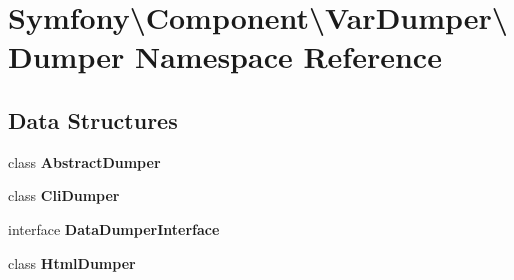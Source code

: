 \section{Symfony\textbackslash{}Component\textbackslash{}Var\+Dumper\textbackslash{}Dumper Namespace Reference}
\label{namespace_symfony_1_1_component_1_1_var_dumper_1_1_dumper}
\subsection*{Data Structures}
\begin{DoxyCompactItemize}
\item 
class {\bf Abstract\+Dumper}
\item 
class {\bf Cli\+Dumper}
\item 
interface {\bf Data\+Dumper\+Interface}
\item 
class {\bf Html\+Dumper}
\end{DoxyCompactItemize}
